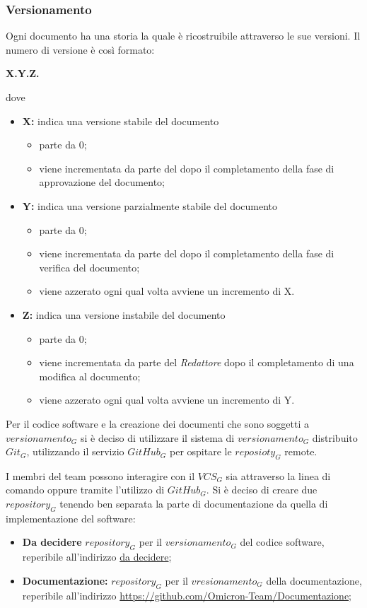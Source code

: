 \subsubsection{Versionamento}
Ogni documento ha una storia la quale è ricostruibile attraverso le sue versioni. Il numero di versione è così formato:
\begin{center}
\textbf{X.Y.Z.}
\end{center}
dove
\begin{itemize}
 \item \textbf{X:} indica una versione stabile del documento
 	\begin{itemize}
 		\item parte da 0;
 		\item viene incrementata da parte del \respProg dopo il completamento della fase di approvazione del documento;
 	\end{itemize}
 \item \textbf{Y:}  indica una versione parzialmente stabile del documento
 	\begin{itemize}
 		\item parte da 0;
 		\item viene incrementata da parte del \verifProg dopo il completamento della fase di verifica del documento;
 		\item viene azzerato ogni qual volta avviene un incremento di X.
 	\end{itemize}
 \item \textbf{Z:} indica una versione instabile del documento
 \begin{itemize}
 		\item parte da 0;
 		\item viene incrementata da parte del \emph{Redattore} dopo il completamento di una modifica al documento;
 		\item viene azzerato ogni qual volta avviene un incremento di Y.
 	\end{itemize}
\end{itemize}

Per il codice software e la creazione dei documenti che sono soggetti a $versionamento_G$ si è deciso di utilizzare il sistema di $versionamento_G$ distribuito $Git_G$, utilizzando il servizio $GitHub_G$ per ospitare le $reposioty_G$ remote.


I membri del team \Omicron possono interagire con il $VCS_G$ sia attraverso la linea di comando oppure tramite l'utilizzo di $GitHub_G$. Si è deciso di creare due $repository_G$ tenendo ben separata la parte di documentazione da quella di implementazione del software:
\begin{itemize}
 \item \textbf{Da decidere} $repository_G$ per il $versionamento_G$ del codice software, reperibile all'indirizzo \url{da decidere};
 \item \textbf{Documentazione:} $repository_G$ per il $vresionamento_G$ della documentazione, reperibile all'indirizzo \url{https://github.com/Omicron-Team/Documentazione};
\end{itemize}

